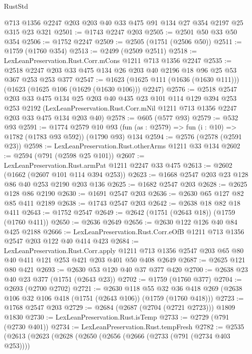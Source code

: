 \begin{lexlean}{RustStd}
\begin{coremodule}
    @713
    @1356
    @2247
    @203
    @203
    @40
    @33
    @475
    @91
    @134
    @27
    @354
    @2197
    @25
    @315
    @23
    @321
@2501 := @1743 @2247 @203
@2505 := @2501 @50 @33 @50 @354
@2506 := @1752 @2247
@2509 := @2505 (@1751 (@2506 @50))
@2511 := @1759 (@1760 @354)
@2513 := @2499 (@2509 @2511)
@2518 := LexLeanPreservation.Rust.Corr.mCons @1211 @713 @1356 @2247
@2535 := @2518 @2247 @203 @33 @475 @134 @26 @203 @40 @2196 @18 @96 @25 @53 @367 @253 @253 @377
@2547 := @1623 (@1625 @111 (@1636 (@1630 @111))) (@1623 (@1625 @106 (@1629 (@1630 @106))) @2247)
@2576 := @2518
    @2547
    @203
    @33
    @475
    @134
    @25
    @203
    @40
    @435
    @23
    @101
    @114
    @129
    @394
    @253
    @253
    @2192
    (LexLeanPreservation.Rust.Corr.mNil @1211 @713 @1356 @2247 @203 @33 @475 @134 @203 @40)
@2578 := @605 (@577 @93)
@2579 := @532 @93
@2591 := @1774
    @2579
    @10
    @93
    (fun (as : @2579) => fun (i : @10) => @1782 (@1783 @93 @592))
    (@1790 @93)
    @134
@2594 := @2576 (@2578 (@2591 @23))
@2598 := LexLeanPreservation.Rust.otherArms @1211 @33 @134
@2602 := @2594 (@791 (@2598 @25 @101))
@2607 := LexLeanPreservation.Rust.armPat @1211 @2247 @33 @475
@2613 := @2602 (@1662 (@2607 @101 @114 @394 @253))
@2623 := @1668 @2547 @203 @23 @128 @86 @40 @253 @2190 @203 @136
@2625 := @1682 @2547 @203
@2628 := @2625 @128 @86 @2190
@2630 := @1691 @2547 @203
@2636 := @2630 @65 @127 @82 @85 @411 @2189
@2638 := @1743 @2547 @203
@2642 := @2638 @18 @82 @18 @411
@2643 := @1752 @2547
@2649 := @2642 (@1751 (@2643 @18)) (@1759 (@1760 @411))
@2650 := @2636 @2649
@2656 := @2630 @122 @126 @40 @84 @425 @2188
@2666 := LexLeanPreservation.Rust.Corr.eOfB @1211 @713 @1356 @2547 @203 @122 @40 @414 @423
@2684 := LexLeanPreservation.Rust.Corr.apply
    @1211
    @713
    @1356
    @2547
    @203
    @65
    @80
    @40
    @411
    @121
    @253
    @421
    @203
    @401
    @50
    @408
    @2649
@2687 := @2625 @121 @80 @421
@2693 := @2630 @53 @120 @40 @37 @377 @420
@2700 := @2638 @23 @40 @23 @377 (@1751 (@2643 @23))
@2702 := @1759 (@1760 @377)
@2704 := @2693 (@2700 @2702)
@2721 := @2630
    @118
    @55
    @32
    @36
    @418
    @269
    (@2638 @106 @32 @106 @418 (@1751 (@2643 @106)) (@1759 (@1760 @418)))
@2723 := @1768 @2547 @203
@2729 := @2684 (@2687 (@2704 (@2721 @2723))) @1809 @1830
@2730 := LexLeanPreservation.Rust.isTemp
@2733 := @2729 (@791 (@2730 @401))
@2734 := LexLeanPreservation.Rust.tempFresh
@2782 := @2535
    (@2613
      (@2623
        (@2628
          (@2650
            (@2656
              (@2666 (@2733 (@791 (@2734 @403 @253))))

\end{coremodule}
\end{lexlean}
